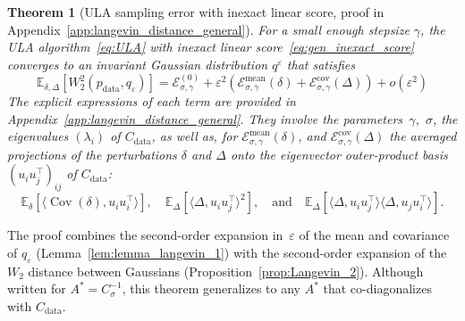 \documentclass[11pt]{article}
\newtheorem{thm}{Theorem}
\newcommand{\EE}{\mathbb{E}}
\newcommand{\cov}{\operatorname{Cov}}
\begin{document}
\begin{thm}[ULA sampling error with inexact linear score, proof in Appendix~\ref{app:langevin_distance_general}] \label{thm:langevin_distance_general}
For a small enough stepsize $\gamma$, the ULA algorithm~\eqref{eq:ULA} with inexact linear score~\eqref{eq:gen_inexact_score} converges to an invariant Gaussian distribution $q^\varepsilon$ that satisfies 
\begin{equation*} 
\EE_{\delta, \Delta}  \left[ W_2^2(p_\mathrm{data},q_\varepsilon) \right] =  \mathcal{E}^{(0)}_{\sigma, \gamma} + \varepsilon^2 \left( \mathcal{E}_{\sigma, \gamma}^{\text{mean}}(\delta) + \mathcal{E}_{\sigma, \gamma}^{\text{cov}}(\Delta) \right) + o(\varepsilon^2)
\end{equation*}
The explicit expressions of each term are provided in Appendix~\ref{app:langevin_distance_general}. They involve the parameters~\( \gamma \),~\( \sigma \), the eigenvalues \( (\lambda_i) \) of \( C_{\mathrm{data}} \), as well as, for $\mathcal{E}_{\sigma, \gamma}^{\text{mean}}(\delta)$, and $\mathcal{E}_{\sigma, \gamma}^{\text{cov}}(\Delta)$  the averaged projections of the perturbations $\delta$ and $\Delta$ onto the eigenvector outer-product basis \( (u_i u_j^\top)_{ij} \) of \(C_{\mathrm{data}}\):
\[
\mathbb{E}_{\delta} \left[ \langle \operatorname{Cov}(\delta), u_i u_i^\top \rangle \right], \quad 
\mathbb{E}_{\Delta} \left[ \langle \Delta, u_i u_j^\top \rangle^2 \right], \quad \text{and} \quad
\mathbb{E}_{\Delta} \left[ \langle \Delta, u_i u_j^\top \rangle \langle \Delta, u_j u_i^\top \rangle \right].
\]
\end{thm}
The proof combines the second-order expansion in~$\varepsilon$ of the mean and covariance of $q_\varepsilon$ (Lemma~\ref{lem:lemma_langevin_1}) with the second-order expansion of the $W_2$ distance between Gaussians (Proposition~\ref{prop:Langevin_2}). Although written for $A^* = C_\sigma^{-1}$, this theorem generalizes to any $A^*$ that co-diagonalizes with $C_\mathrm{data}$. %
\end{document}
